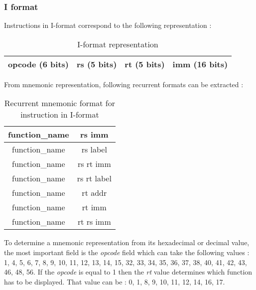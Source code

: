 \subsubsection*{I format}

	Instructions in I-format correspond to the following representation : 
	\begin{table}[H]
		\centering
		\begin{tabular}{|c|c|c|c|}
		\hline 
		opcode (6 bits) & rs (5 bits) & rt (5 bits) & imm (16 bits) \\ 
		\hline 
		\end{tabular} 
		\caption{I-format representation}
	\end{table}
	
	From mnemonic representation, following recurrent formats can be extracted : 
	\begin{table}[H]
		\centering
		\begin{tabular}{|c|c|}
		\hline 
		function\_name & rs imm\\ 
		\hline 
		function\_name & rs label\\ 
		\hline 
		function\_name & rs rt imm\\ 
		\hline 
		function\_name & rs rt label\\ 
		\hline 
		function\_name & rt addr \\ 
		\hline 
		function\_name & rt imm \\ 
		\hline 
		function\_name & rt rs imm \\ 
		\hline 
		\end{tabular} 
		\caption{Recurrent mnemonic format for instruction in I-format}
	\end{table}
	
	To determine a mnemonic representation from its hexadecimal or decimal value, the most important field is the \textit{opcode}  field which can take the following values : 1, 4, 5, 6, 7, 8, 9, 10, 11, 12, 13, 14, 15, 32, 33, 34, 35, 36, 37, 38, 40, 41, 42, 43, 46, 48, 56. If the \textit{opcode} is equal to 1 then the \textit{rt} value determines which function has to be displayed. That value can be : 0, 1, 8, 9, 10, 11, 12, 14, 16, 17.